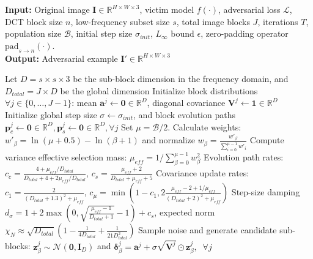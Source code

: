 \begin{algorithm}[h]
\caption{Gradient-Free Frequency-Domain Black-Box Attack}
\label{alg:freq_cmaes_full}
\fontsize{9}{9.8}\selectfont
\textbf{Input:} Original image $\bm{I}\in \mathbb{R}^{H \times W \times 3}$, victim model $f(\cdot)$, adversarial loss $\mathcal{L}$, DCT block size $n$, low-frequency subset size $s$, total image blocks $J$, iterations $T$, population size $\mathcal{B}$, initial step size $\sigma_{init}$, $L_\infty$ bound $\epsilon$, zero-padding operator $\text{pad}_{s \to n}(\cdot)$. \\
\textbf{Output:} Adversarial example $\bm{I}'\in \mathbb{R}^{H \times W \times 3}$
\begin{algorithmic}[1] %
\State Let $D = s \times s \times 3$ be the sub-block dimension in the frequency domain, and $D_{total} = J \times D$ be the global dimension
\State Initialize block distributions $\forall j \in \{0, \dots, J-1\}$: mean $\bm{a}^j \leftarrow \mathbf{0} \in \mathbb{R}^D$, diagonal covariance $\bm{V}^j \leftarrow \mathbf{1} \in \mathbb{R}^D$
\State Initialize global step size $\sigma \leftarrow \sigma_{init}$, and block evolution paths $\bm{p}_c^j \leftarrow \mathbf{0} \in \mathbb{R}^D, \bm{p}_s^j \leftarrow \mathbf{0} \in \mathbb{R}^D, \forall j$
\vspace{0.05cm}
\State Set $\mu = \mathcal{B}/2$. Calculate weights: $w'_\beta = \ln(\mu + 0.5) - \ln(\beta + 1)$ and normalize $w_\beta = \frac{w'_\beta}{\sum_{i=0}^{\mu-1} w'_i}$
\State Compute variance effective selection mass: $\mu_{eff} = 1 \big/ \sum_{\beta=0}^{\mu-1} w_\beta^2$
\State Evolution path rates: $c_c = \frac{4 + \mu_{eff}/D_{total}}{D_{total} + 4 + 2\mu_{eff}/D_{total}}$, \quad $c_s = \frac{\mu_{eff} + 2}{D_{total} + \mu_{eff} + 5}$
\State Covariance update rates: $c_1 = \frac{2}{(D_{total} + 1.3)^2 + \mu_{eff}}$, \quad $c_\mu = \min\left(1 - c_1, 2\frac{\mu_{eff} - 2 + 1/\mu_{eff}}{(D_{total} + 2)^2 + \mu_{eff}}\right)$
\State Step-size damping $d_\sigma = 1 + 2\max\left(0, \sqrt{\frac{\mu_{eff} - 1}{D_{total} + 1}} - 1\right) + c_s$, expected norm $\chi_N \approx \sqrt{D_{total}}\left(1 - \frac{1}{4D_{total}} + \frac{1}{21D_{total}^2}\right)$
\vspace{0.05cm}
    \vspace{0.05cm}
        \State Sample noise and generate candidate sub-blocks: $\bm{z}_\beta^j \sim \mathcal{N}(\mathbf{0}, \bm{I}_D)$ and \Statex \hspace{4em}$\bm{\delta}_\beta^j = \bm{a}^j + \sigma \sqrt{\bm{V}^j} \odot \bm{z}_\beta^j, \;\; \forall j$

\end{algorithmic}
\end{algorithm}
